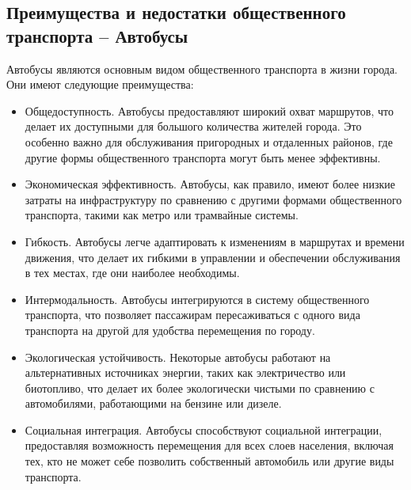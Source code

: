\subsection{Преимущества и недостатки общественного транспорта -- Автобусы}

Автобусы являются основным видом общественного транспорта в жизни города. Они имеют следующие преимущества:
\begin{itemize}
	\item Общедоступность. Автобусы предоставляют широкий охват маршрутов, что делает их доступными для большого количества жителей города. Это особенно важно для обслуживания пригородных и отдаленных районов, где другие формы общественного транспорта могут быть менее эффективны.
	\item Экономическая эффективность. Автобусы, как правило, имеют более низкие затраты на инфраструктуру по сравнению с другими формами общественного транспорта, такими как метро или трамвайные системы.
	\item Гибкость. Автобусы легче адаптировать к изменениям в маршрутах и времени движения, что делает их гибкими в управлении и обеспечении обслуживания в тех местах, где они наиболее необходимы.
	\item Интермодальность. Автобусы интегрируются в систему общественного транспорта, что позволяет пассажирам пересаживаться с одного вида транспорта на другой для удобства перемещения по городу.
	\item Экологическая устойчивость. Некоторые автобусы работают на альтернативных источниках энергии, таких как электричество или биотопливо, что делает их более экологически чистыми по сравнению с автомобилями, работающими на бензине или дизеле.
	\item Социальная интеграция. Автобусы способствуют социальной интеграции, предоставляя возможность перемещения для всех слоев населения, включая тех, кто не может себе позволить собственный автомобиль или другие виды транспорта.
\end{itemize}

